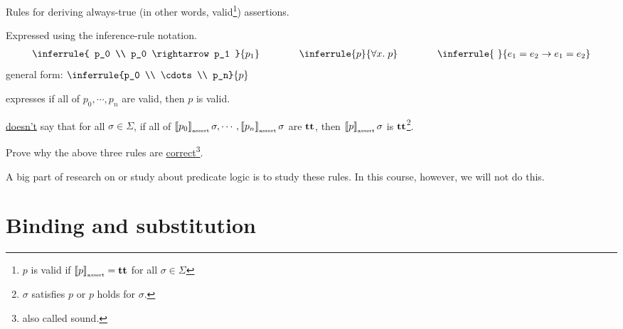 \begin{enumcirc}
	\begin{enumcirc}
		\item
		Rules for deriving always-true (in other words, valid\footnote{ $p$ is valid if
			$\left\llbracket p \right\rrbracket_{\textrm{\tiny assert}}=\textbf{tt}$ for all $\sigma \in \Sigma$ }) assertions.
		\item
		Expressed using the inference-rule notation.
		\[
			\begin{array}{c}
				\inferrule{ p_0 \\ p_0 \rightarrow p_1 }{p_1}
				\qquad \qquad
				\inferrule{ p }{\forall x .\; p}
				\qquad \qquad
				\inferrule{\ }{e_1 = e_2 \rightarrow e_1 = e_2}
				\\
			\end{array}
		\]
		general form: $ \inferrule{p_0 \\ \cdots \\ p_n}{p}$
		\begin{enumrm}
			\item
			expresses if all of $p_0, \cdots , p_n$ are valid, then $p$ is valid.
			\item
			\underline{doesn't} say that for all $\sigma \in \Sigma$, if all of
			$\left\llbracket p_0 \right\rrbracket_{\textrm{\tiny assert}}\sigma, \cdots , \left\llbracket p_n \right\rrbracket_{\textrm{\tiny assert}}\sigma$ are $\textbf{tt}$, then
			$\left\llbracket p \right\rrbracket_{\textrm{\tiny assert}}\sigma$ is $\textbf{tt}$\footnote{
				$\sigma$ satisfies $p$ or $p$ holds for $\sigma$.
			}.
		\end{enumrm}
		\begin{exercise}
			Prove why the above three rules are \underline{correct}\footnote{also called sound.}.
		\end{exercise}
		\item
		A big part of research on or study about predicate logic is to study these
		rules.
		In this course, however, we will not do this.
	\end{enumcirc}
\end{enumcirc}

\section{Binding and substitution}

